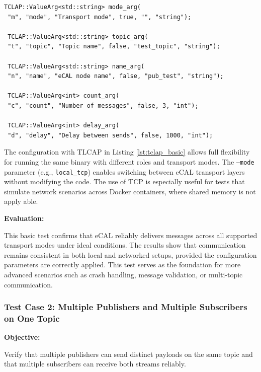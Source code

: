 \begin{lstlisting}[style=cppstyle, caption={Argument setup using TCLAP in both publisher and subscriber}, label={lst:tclap_basic}, captionpos=b]
 TCLAP::ValueArg<std::string> mode_arg(
 "m", "mode", "Transport mode", true, "", "string");
 
 TCLAP::ValueArg<std::string> topic_arg(
 "t", "topic", "Topic name", false, "test_topic", "string");
 
 TCLAP::ValueArg<std::string> name_arg(
 "n", "name", "eCAL node name", false, "pub_test", "string");
 
 TCLAP::ValueArg<int> count_arg(
 "c", "count", "Number of messages", false, 3, "int");
 
 TCLAP::ValueArg<int> delay_arg(
 "d", "delay", "Delay between sends", false, 1000, "int");
\end{lstlisting}

\vspace{0.4em}
The configuration with TLCAP in Listing \ref{lst:tclap_basic} allows full flexibility for running the same binary with different roles and transport modes. The \texttt{--mode} parameter (e.g., \texttt{local\_tcp}) enables switching between eCAL transport layers without modifying the code. The use of TCP is especially useful for tests that simulate network scenarios across Docker containers, where shared memory is not apply able.

\vspace{1em}

\textbf{Evaluation:}

\vspace{0.4em}
This basic test confirms that eCAL reliably delivers messages across all supported transport modes under ideal conditions. The results show that communication remains consistent in both local and networked setups, provided the configuration parameters are correctly applied. This test serves as the foundation for more advanced scenarios such as crash handling, message validation, or multi-topic communication.


\vspace{1em}
\vspace{1em}
\subsubsection*{Test Case 2: Multiple Publishers and Multiple Subscribers on One Topic}

\textbf{Objective:}

\vspace{0.4em}
Verify that multiple publishers can send distinct payloads on the same topic and that multiple subscribers can receive both streams reliably.

